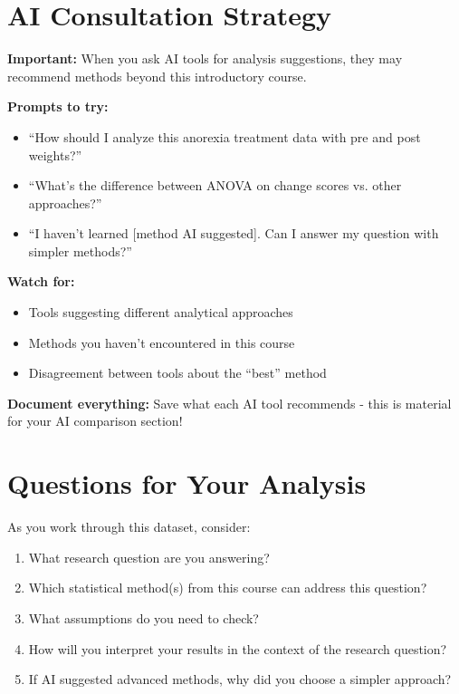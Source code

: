 \documentclass[11pt]{article}
\begin{document}
\section*{AI Consultation Strategy}

\begin{tcolorbox}[colback=aiblue!10,colframe=aiblue,boxrule=1pt,arc=2pt]
\textbf{Important:} When you ask AI tools for analysis suggestions, they may recommend methods beyond this introductory course.

\textbf{Prompts to try:}
\begin{itemize}
\item ``How should I analyze this anorexia treatment data with pre and post weights?''
\item ``What's the difference between ANOVA on change scores vs. other approaches?''
\item ``I haven't learned [method AI suggested]. Can I answer my question with simpler methods?''
\end{itemize}

\textbf{Watch for:}
\begin{itemize}
\item Tools suggesting different analytical approaches
\item Methods you haven't encountered in this course
\item Disagreement between tools about the ``best'' method
\end{itemize}

\textbf{Document everything:} Save what each AI tool recommends - this is material for your AI comparison section!
\end{tcolorbox}

\section*{Questions for Your Analysis}

As you work through this dataset, consider:

\begin{enumerate}
\item What research question are you answering?
\item Which statistical method(s) from this course can address this question?
\item What assumptions do you need to check?
\item How will you interpret your results in the context of the research question?
\item If AI suggested advanced methods, why did you choose a simpler approach?
\end{enumerate}
\end{document}
